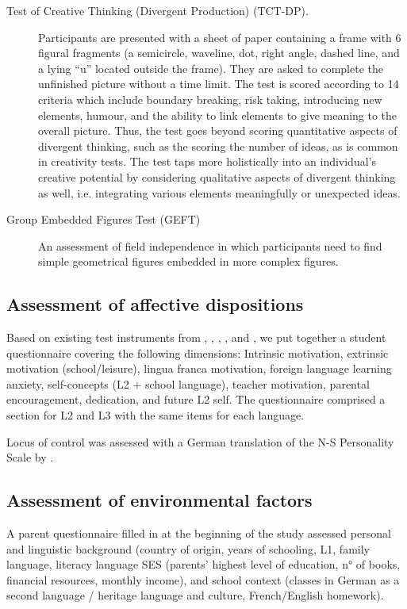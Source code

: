 \documentclass[output=paper]{langsci/langscibook}
\begin{document}
\begin{description}
\item[Test of Creative Thinking (Divergent Production) (TCT-DP). \citep{UrbanJellen1995}]

Participants are presented with a sheet of paper containing a frame with 6 figural fragments (a semicircle, waveline, dot, right angle, dashed line, and a lying “u” located outside the frame). They are asked to complete the unfinished picture without a time limit. The test is scored according to 14 criteria which include boundary breaking, risk taking, introducing new elements, humour, and the ability to link elements to give meaning to the overall picture. Thus, the test goes beyond scoring quantitative aspects of divergent thinking, such as the scoring the number of ideas, as is common in creativity tests. The test taps more holistically into an individual’s creative potential by considering qualitative aspects of divergent thinking as well, i.e. integrating various elements meaningfully or unexpected ideas.

\item[Group Embedded Figures Test (GEFT)]
An assessment of field independence \citep{WitkinEtAl2014} in which participants need to find simple geometrical figures embedded in more complex figures.
\end{description}

\subsection{Assessment of affective dispositions}
Based on existing test instruments from \citet{HorwitzEtAl1986}, \citet{Stoeckli2004}, \citet{Doernyei2010}, \citet{Heinzmann2013}, and \citet{PeyerEtAl2016}, we put together a student questionnaire covering the following dimensions: Intrinsic motivation, extrinsic motivation (school/leisure), lingua franca motivation, foreign language learning anxiety, self-concepts (L2 + school language), teacher motivation, parental encouragement, dedication, and future L2 self. The questionnaire comprised a section for L2 and L3 with the same items for each language. 

Locus of control was assessed with a German translation of the N-S Personality Scale by \citet{NowickiStrickland1973}.

\subsection{Assessment of environmental factors}
A parent questionnaire filled in at the beginning of the study assessed personal and linguistic background (country of origin, years of schooling, L1, family language, literacy language SES (parents’ highest level of education, n° of books, financial resources, monthly income), and school context (classes in German as a second language / heritage language and culture, French/English homework).
\end{document}
